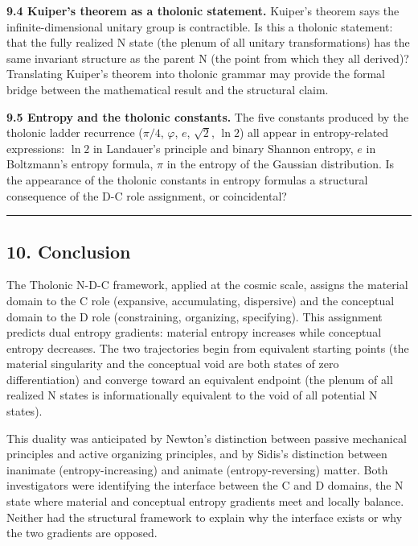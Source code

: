 \documentclass[
  11pt,
  letterpaper,
]{article}
\begin{document}
\textbf{9.4 Kuiper's theorem as a tholonic statement.} Kuiper's theorem
says the infinite-dimensional unitary group is contractible. Is this a
tholonic statement: that the fully realized N state (the plenum of all
unitary transformations) has the same invariant structure as the parent
N (the point from which they all derived)? Translating Kuiper's theorem
into tholonic grammar may provide the formal bridge between the
mathematical result and the structural claim.

\textbf{9.5 Entropy and the tholonic constants.} The five constants
produced by the tholonic ladder recurrence (\(\pi/4\), \(\varphi\),
\(e\), \(\sqrt{2}\), \(\ln 2\)) all appear in entropy-related
expressions: \(\ln 2\) in Landauer's principle and binary Shannon
entropy, \(e\) in Boltzmann's entropy formula, \(\pi\) in the entropy of
the Gaussian distribution. Is the appearance of the tholonic constants
in entropy formulas a structural consequence of the D-C role assignment,
or coincidental?

\begin{center}\rule{0.5\linewidth}{0.5pt}\end{center}

\subsection{10. Conclusion}\label{conclusion}

The Tholonic N-D-C framework, applied at the cosmic scale, assigns the
material domain to the C role (expansive, accumulating, dispersive) and
the conceptual domain to the D role (constraining, organizing,
specifying). This assignment predicts dual entropy gradients: material
entropy increases while conceptual entropy decreases. The two
trajectories begin from equivalent starting points (the material
singularity and the conceptual void are both states of zero
differentiation) and converge toward an equivalent endpoint (the plenum
of all realized N states is informationally equivalent to the void of
all potential N states).

This duality was anticipated by Newton's distinction between passive
mechanical principles and active organizing principles, and by Sidis's
distinction between inanimate (entropy-increasing) and animate
(entropy-reversing) matter. Both investigators were identifying the
interface between the C and D domains, the N state where material and
conceptual entropy gradients meet and locally balance. Neither had the
structural framework to explain why the interface exists or why the two
gradients are opposed.
\end{document}
